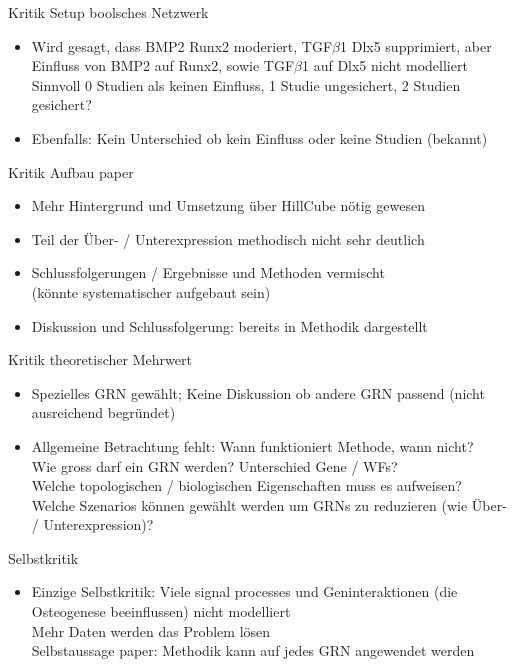 \documentclass[]{beamer}
\begin{document}
\begin{frame}{Kritik Setup boolsches Netzwerk}
\begin{itemize}
	\item Wird gesagt, dass BMP2 Runx2 moderiert, TGF$\beta$1 Dlx5 supprimiert, aber Einfluss von BMP2 auf Runx2, sowie TGF$\beta$1 auf Dlx5 nicht modelliert
\pause
\\ Sinnvoll 0 Studien als keinen Einfluss, 1 Studie ungesichert, 2 Studien gesichert?
\pause
\item Ebenfalls: Kein Unterschied ob kein Einfluss oder keine Studien (bekannt)
\end{itemize}
\end{frame}

\begin{frame}{Kritik Aufbau paper}
\begin{itemize}
	\item Mehr Hintergrund und Umsetzung \"uber HillCube n\"otig gewesen
	\pause
	\item Teil der \"Uber- / Unterexpression methodisch nicht sehr deutlich
	\pause
	\item Schlussfolgerungen / Ergebnisse und Methoden vermischt
	\\ (k\"onnte systematischer aufgebaut sein)
	\pause
	\item Diskussion und Schlussfolgerung: bereits in Methodik dargestellt
\end{itemize}
\end{frame}

\begin{frame}{Kritik theoretischer Mehrwert}
\begin{itemize}
	\item Spezielles GRN gew\"ahlt; Keine Diskussion ob andere GRN passend (nicht ausreichend begr\"undet)
	\pause
	\item Allgemeine Betrachtung fehlt: Wann funktioniert Methode, wann nicht?
	\pause
	\\ Wie gross darf ein GRN werden?
	\pause
	Unterschied Gene / WFs?
	\pause
	\\ Welche topologischen / biologischen Eigenschaften muss es aufweisen?
	\pause
	\\ Welche Szenarios k\"onnen gew\"ahlt werden um GRNs zu reduzieren (wie \"Uber- / Unterexpression)?
\end{itemize}
\end{frame}

\begin{frame}{Selbstkritik}
\begin{itemize}
	\item Einzige Selbstkritik: Viele signal processes und Geninteraktionen (die Osteogenese beeinflussen) nicht modelliert
	\pause
	\\ Mehr Daten werden das Problem l\"osen
	\pause
	\\ Selbstaussage paper: Methodik kann auf jedes GRN angewendet werden
\end{itemize}
\end{frame}
\end{document}
